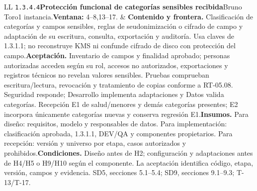 \begin{longtable}{L{\tabcolsep\relax}L{\tabcolsep\relax}}
\texttt{1.\allowbreak{}3.\allowbreak{}4.\allowbreak{}4}\newline{}\textbf{Protección funcional de categorías sensibles recibida}\newline{}Bruno Toro\newline{}1 instancia.\newline{}\textbf{Ventana:} 4--8,13--17. & \textbf{Contenido y frontera.} Clasificación de categorías y campos sensibles, reglas de seudonimización o cifrado de campo y adaptación de su escritura, consulta, exportación y auditoría. Usa claves de 1.3.1.1; no reconstruye KMS ni confunde cifrado de disco con protección del campo.\newline{}\textbf{Aceptación.} Inventario de campos y finalidad aprobado; personas autorizadas acceden según su rol, accesos no autorizados, exportaciones y registros técnicos no revelan valores sensibles. Pruebas comprueban escritura/lectura, revocación y tratamiento de copias conforme a RT-05.08. Seguridad responde; Desarrollo implementa adaptaciones y Datos valida categorías. Recepción E1 de salud/menores y demás categorías presentes; E2 incorpora únicamente categorías nuevas y conserva regresión E1.\newline{}\textbf{Insumos.} Para diseño: requisitos, modelo y responsables de datos. Para implementación: clasificación aprobada, 1.3.1.1, DEV/QA y componentes propietarios. Para recepción: versión y universo por etapa, casos autorizados y prohibidos.\newline{}\textbf{Condiciones.} Diseño antes de H2; configuración y adaptaciones antes de H4/H5 o H9/H10 según el componente. La aceptación identifica código, etapa, versión, campos y evidencia. SD5, secciones 5.1--5.4; SD9, secciones 9.1--9.3; T-13/T-17.\\\hline
\end{longtable}\endgroup
\begingroup\setlength{\tabcolsep}{3pt}
